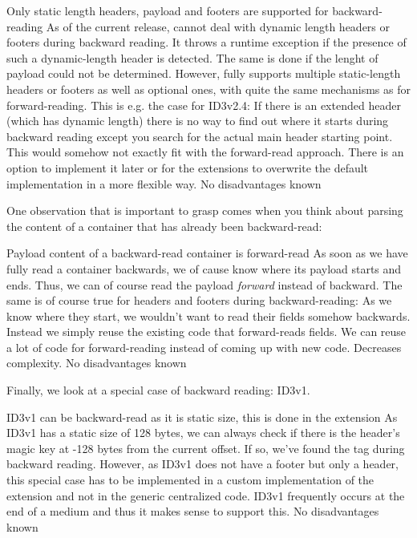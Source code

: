 {%
Only static length headers, payload and footers are supported for backward-reading
}
{%
As of the current release, \LibName{} cannot deal with dynamic length headers or footers during backward reading. It throws a runtime exception if the presence of such a dynamic-length header is detected. The same is done if the lenght of payload could not be determined. However, \LibName{} fully supports multiple static-length headers or footers as well as optional ones, with quite the same mechanisms as for forward-reading. 
}
{%
This is e.g. the case for ID3v2.4: If there is an extended header (which has dynamic length) there is no way to find out where it starts during backward reading except you search for the actual main header starting point. This would somehow not exactly fit with the forward-read approach. There is an option to implement it later or for the extensions to overwrite the default implementation in a more flexible way.
}
{%
No disadvantages known
}

One observation that is important to grasp comes when you think about parsing the content of a container that has already been backward-read:

{%
Payload content of a backward-read container is forward-read
}
{%
As soon as we have fully read a container backwards, we of cause know where its payload starts and ends. Thus, we can of course read the payload \emph{forward} instead of backward. The same is of course true for headers and footers during backward-reading: As we know where they start, we wouldn't want to read their fields somehow backwards. Instead we simply reuse the existing code that forward-reads fields.
}
{%
We can reuse a lot of code for forward-reading instead of coming up with new code. Decreases complexity.
}
{%
No disadvantages known
}

Finally, we look at a special case of backward reading: ID3v1.

{%
ID3v1 can be backward-read as it is static size, this is done in the extension
}
{%
As ID3v1 has a static size of 128 bytes, we can always check if there is the header's magic key at -128 bytes from the current offset. If so, we've found the tag during backward reading. However, as ID3v1 does not have a footer but only a header, this special case has to be implemented in a custom implementation of the extension and not in the generic centralized code.
}
{%
ID3v1 frequently occurs at the end of a medium and thus it makes sense to support this.
}
{%
No disadvantages known
}

